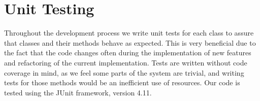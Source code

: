 \section{Unit Testing}\label{sec:unittesting}
Throughout the development process we write unit tests for each class to assure that classes and their methods behave as expected. This is very beneficial due to the fact that the code changes often during the implementation of new features and refactoring of the current implementation. Tests are written without code coverage in mind, as we feel some parts of the system are trivial, and writing tests for those methods would be an inefficient use of resources. Our code is tested using the JUnit \cite{JUNIT} framework, version 4.11. 


%
%
